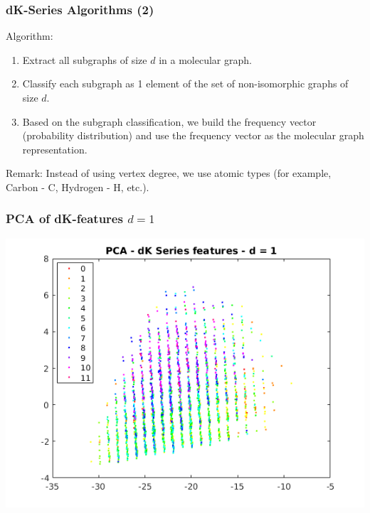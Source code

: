 \documentclass{beamer}
\begin{document}
\begin{frame}
\frametitle{dK-Series Algorithms (2)}
\begin{justify}
Algorithm:
\begin{enumerate}
	\item Extract all subgraphs of size $d$ in a molecular graph.
	\item Classify each subgraph as 1 element of the set of non-isomorphic graphs of size $d$.
	\item Based on the subgraph classification, we build the frequency vector (probability distribution) and use the frequency vector as the molecular graph representation. 
\end{enumerate}
Remark: Instead of using vertex degree, we use atomic types (for example, Carbon - C, Hydrogen - H, etc.).
\end{justify}
\end{frame}

\begin{frame}
\frametitle{PCA of dK-features $d = 1$}
\begin{justify}
\begin{center}
	\includegraphics[scale=0.5]{d1-PCA}
\end{center}
\end{justify}
\end{frame}
\end{document}
